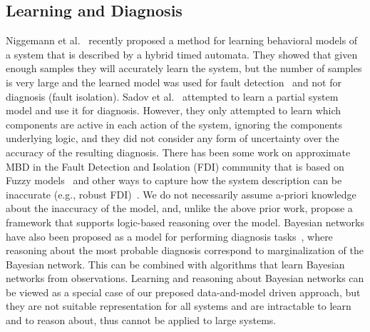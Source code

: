 \documentclass[12pt]{article}
\newcommand{\note}[1]{\textbf{\textit{#1}}}
\begin{document}
\subsection{Learning and Diagnosis}
Niggemann et al.~\cite{niggemann2012learning} recently proposed a method for learning behavioral models of a system that is described by a hybrid timed automata. They showed that given enough samples they will accurately learn the system, but the number of samples is very large 
and the learned model was used for fault detection~\cite{niggemann2012learning} and not for diagnosis (fault isolation). Sadov et al.~\cite{sadov2010towards} attempted to learn a partial system model and use it for diagnosis. However, they only attempted to learn which components are active in each action of the system, ignoring the components underlying logic, and they did not consider any form of uncertainty over the  accuracy of the resulting diagnosis. 
There has been some work on approximate MBD in the Fault Detection and Isolation (FDI) community that is based on Fuzzy models~\cite{dexter1997model,mendoncca2003fault,castillo2005model,mendoncca2009architecture} and other ways to capture how the system description can be inaccurate (e.g., robust FDI)~\cite{chen2012robust,frank1997survey}. 
We do not necessarily assume a-priori knowledge about the inaccuracy of the model, and, unlike the above prior work, propose a framework that supports logic-based reasoning over the model.
Bayesian networks have also been proposed as a model for performing diagnosis tasks~\cite{darwiche2009modeling,el1995diagnosing}, where reasoning about the most probable diagnosis correspond to marginalization of the Bayesian network. This can be combined with algorithms that learn Bayesian networks from observations. Learning and reasoning about Bayesian networks can be viewed as a special case of our preposed data-and-model driven approach, but they are not suitable representation for all systems and are intractable  to learn and to reason about, thus cannot be applied to large systems. %


\end{document}
